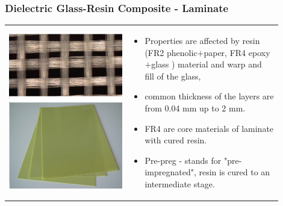 \documentclass{beamer}
\begin{document}
	\begin{frame}
    \frametitle{Dielectric Glass-Resin Composite - Laminate}
		\small
		\begin{center}
			\begin{tabular}{m{0.4\linewidth} m{0.5\linewidth}}
			\includegraphics[scale=0.2]{obr23_FR4.png} &
			
			\begin{itemize}
				\item Properties are affected by resin (FR2 phenolic$+$paper, FR4 epoxy$+$glass ) material and warp and fill of the glass,
				\item common thickness of the layers are from 0.04 mm up to 2 mm.
				\item FR4 are core materials of laminate with cured resin.
				\item Pre-preg - stands for "pre-impregnated", resin is cured to an intermediate stage.
			\end{itemize}
			\end{tabular}
		\end{center}
	\end{frame}
\end{document}
